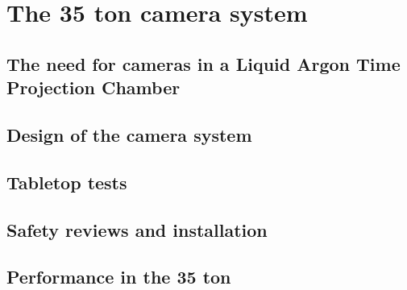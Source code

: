 
\chapter{The 35 ton camera system}  %

\ifpdf
    \graphicspath{{The35tonCameras/Figs/Raster/}{The35tonCameras/Figs/PDF/}{The35tonCameras/Figs/}}
\else
    \graphicspath{{The35tonCameras/Figs/Vector/}{The35tonCameras/Figs/}}
\fi

\section{The need for cameras in a Liquid Argon Time Projection Chamber} %

\section{Design of the camera system} %

\section{Tabletop tests}  %

\section{Safety reviews and installation}  %

\section{Performance in the 35 ton}  %
